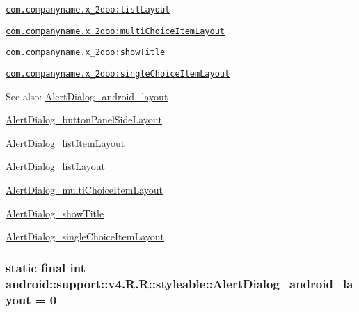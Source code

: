 {\tt \hyperlink{classandroid_1_1support_1_1v4_1_1_r_1_1styleable_0403be32bcf503a2c849b039a63da598}{com.companyname.x\_\-2doo:listLayout}}

{\tt \hyperlink{classandroid_1_1support_1_1v4_1_1_r_1_1styleable_c064dc58d9cc15c073b7697e72f46058}{com.companyname.x\_\-2doo:multiChoiceItemLayout}}

{\tt \hyperlink{classandroid_1_1support_1_1v4_1_1_r_1_1styleable_a4d768767c275e92e5916084f753a001}{com.companyname.x\_\-2doo:showTitle}}

{\tt \hyperlink{classandroid_1_1support_1_1v4_1_1_r_1_1styleable_448e0ef41be3c7030dcffa62d3922bfb}{com.companyname.x\_\-2doo:singleChoiceItemLayout}}

\begin{Desc}
\item[See also:]\hyperlink{classandroid_1_1support_1_1v4_1_1_r_1_1styleable_705bd8f65b9cad04ffe647abf449892c}{AlertDialog\_\-android\_\-layout} 

\hyperlink{classandroid_1_1support_1_1v4_1_1_r_1_1styleable_5035a6dc698e70cff680cbf999f76b5c}{AlertDialog\_\-buttonPanelSideLayout} 

\hyperlink{classandroid_1_1support_1_1v4_1_1_r_1_1styleable_428eb36452bd3ec51c37fc80329506b7}{AlertDialog\_\-listItemLayout} 

\hyperlink{classandroid_1_1support_1_1v4_1_1_r_1_1styleable_0403be32bcf503a2c849b039a63da598}{AlertDialog\_\-listLayout} 

\hyperlink{classandroid_1_1support_1_1v4_1_1_r_1_1styleable_c064dc58d9cc15c073b7697e72f46058}{AlertDialog\_\-multiChoiceItemLayout} 

\hyperlink{classandroid_1_1support_1_1v4_1_1_r_1_1styleable_a4d768767c275e92e5916084f753a001}{AlertDialog\_\-showTitle} 

\hyperlink{classandroid_1_1support_1_1v4_1_1_r_1_1styleable_448e0ef41be3c7030dcffa62d3922bfb}{AlertDialog\_\-singleChoiceItemLayout} \end{Desc}
\hypertarget{classandroid_1_1support_1_1v4_1_1_r_1_1styleable_705bd8f65b9cad04ffe647abf449892c}{
\subsubsection[{AlertDialog\_\-android\_\-layout}]{\setlength{\rightskip}{0pt plus 5cm}static final int android::support::v4.R.R::styleable::AlertDialog\_\-android\_\-layout = 0}}
\label{classandroid_1_1support_1_1v4_1_1_r_1_1styleable_705bd8f65b9cad04ffe647abf449892c}


